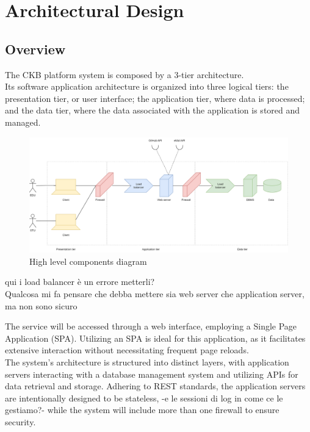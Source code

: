 \chapter{Architectural Design}

\section{Overview}
The CKB platform system is composed by a 3-tier architecture.\\
Its software application architecture is organized into three logical tiers: the presentation tier, or user interface; the application tier, where data is processed; and the data tier, where the data associated with the application is stored and managed.

\begin{figure}[H]
    \centering
    \includegraphics[width=\textwidth]{images/diagrams/high_level_diagram.png}
    \caption{High level components diagram}
\end{figure}

{\color{red} qui i load balancer è un errore metterli? \\ Qualcosa mi fa pensare che debba mettere sia web server che application server, ma non sono sicuro}

The service will be accessed through a web interface, employing a Single Page Application (SPA). Utilizing an SPA is ideal for this application, as it facilitates extensive interaction without necessitating frequent page reloads.\\
The system's architecture is structured into distinct layers, with application servers interacting with a database management system and utilizing APIs for data retrieval and storage. {\color{red}Adhering to REST standards, the application servers are intentionally designed to be stateless, -e le sessioni di log in come ce le gestiamo?-} while the system will include more than one firewall to ensure security.\\

